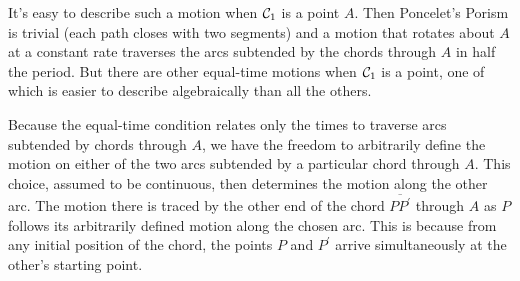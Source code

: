 \documentclass{ximera}
\begin{document}

It's easy to describe such a motion when ${\cal C}_1$ is a point $A$. Then Poncelet's Porism is trivial (each path closes with two segments) and a motion that rotates about $A$ at a constant rate traverses the arcs subtended by the chords through $A$ in half the period. But there are other equal-time motions when ${\cal C}_1$ is a point, one of which is easier to describe algebraically than all the others. 

Because the equal-time condition relates only the times to traverse arcs subtended by chords through $A$, we have the freedom to arbitrarily define the motion on either of the two arcs subtended by a particular chord through $A$. This choice, assumed to be continuous, then determines the motion along the other arc. The motion there is traced by the other end of the chord $\overline{PP^\prime}$ through $A$ as $P$ follows its arbitrarily defined motion along the chosen arc. This is because from any initial position of the chord, the points $P$ and $P^\prime$ arrive simultaneously at the other's starting point.



\end{document}
